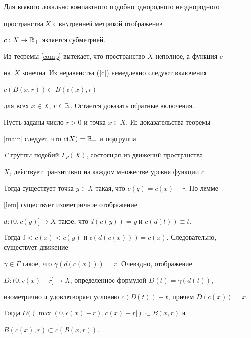 \begin{thms}


\label{sub}


Для всякого локально компактного подобно однородного неоднородного


пространства $X$ с внутренней метрикой отображение


$c: X \rightarrow \Bbb{R}_{+}$ является субметрией.


\end{thms}





\begin{pf}


Из теоремы \ref{comp} вытекает, что пространство $X$ неполное, а функция $c$


на~$X$ конечна. Из неравенства (\ref{c}) немедленно следуют включения


$c(B(x,r)) \subset B(c(x),r)$


для всех $x \in X$, $r \in \Bbb{R}$. Остается доказать обратные включения.





Пусть заданы число $r>0$ и точка $x \in X$. Из доказательства теоремы


\ref{main} следует, что $c(X)=\Bbb{R}_{+}$ и подгруппа


$\Gamma$ группы подобий $\Gamma_{P}(X)$, состоящая из движений пространства


$X$, действует транзитивно на каждом множестве уровня функции $c$.


Тогда существует точка $y \in X$ такая, что $c(y)=c(x)+r$. По лемме


\ref{lem} существует изометричное отображение


$d:(0,c(y)] \rightarrow X$ такое, что $d(c(y))=y$ и $c(d(t)) \equiv t$.


Тогда $0<c(x)<c(y)$ и $c(d(c(x)))=c(x)$. Следовательно, существует движение


$\gamma {\in} \Gamma$ такое, что $\gamma(d(c(x))){=}x$. Очевидно, отображение


$D{:}(0,c(x){+}r] {\rightarrow} X$, определенное формулой $D(t)=\gamma(d(t))$,


изометрично и удовлетворяет условию $c(D(t)) \equiv t$, причем $D(c(x))=x$.


Тогда $D((\max(0,c(x)-r),c(x)+r]) \subset B(x,r)$ и


$B(c(x),r) \subset c(B(x,r))$.


\end{pf}






